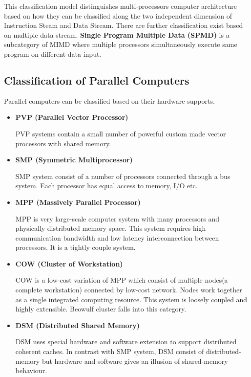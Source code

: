 This classification model distinguishes multi-processors computer architecture based on how they can be classified along the two independent dimension of Instruction Steam and Data Stream. There are further classification exist based on multiple data stream. \textbf{Single Program Multiple Data (SPMD)} is a subcategory of MIMD where multiple processors simultaneously execute same program on different data input.\citep{Barney:16}

\subsection{Classification of Parallel Computers}
Parallel computers can be classified based on their hardware supports. 
\begin{itemize}
	\item \textbf{PVP (Parallel Vector Processor)}

PVP systems contain a small number of powerful custom made vector processors with shared memory.
	\item \textbf{SMP   (Symmetric Multiprocessor)}
	
SMP system consist of a number of processors connected through a bus system. Each processor has equal access to memory, I/O etc.
	
	\item \textbf{MPP   (Massively Parallel Processor)}
	
MPP is very large-scale computer system with many processors and physically distributed memory space. This system requires high communication bandwidth and low latency interconnection between processors. It is a tightly couple system.
	
	\item \textbf{COW (Cluster of Workstation)}
	
COW is a low-cost variation of MPP which consist of multiple nodes(a complete workstation) connected by low-cost network. Nodes work together as a single integrated computing resource. This system is loosely coupled and highly extensible. Beowulf cluster falls into this category.
	
	\item \textbf{DSM  (Distributed Shared Memory)}
	
DSM uses special hardware and software extension to support distributed coherent caches. In contrast with SMP system, DSM consist of distributed-memory but hardware and software gives an illusion of shared-memory behaviour.
\end{itemize}
\citep{Perkowski:10}

